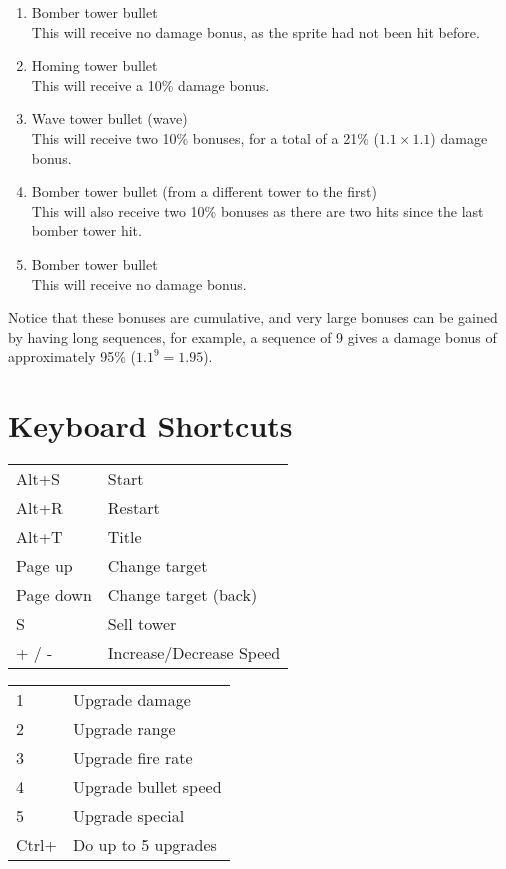 \documentclass[a4paper,11pt]{article}
\begin{document}
\begin{enumerate}
 \item Bomber tower bullet\\
 This will receive no damage bonus, as the sprite had not been hit before.
 \item Homing tower bullet\\
 This will receive a 10\% damage bonus.
 \item Wave tower bullet (wave)\\
 This will receive two 10\% bonuses, for a total of a 21\% (\(1.1 \times 1.1\)) damage bonus.
 \item Bomber tower bullet (from a different tower to the first)\\
 This will also receive two 10\% bonuses as there are two hits since the last bomber tower hit.
 \item Bomber tower bullet\\
 This will receive no damage bonus.
\end{enumerate}

Notice that these bonuses are cumulative, and very large bonuses can be gained by having long sequences, for example, a sequence of 9 gives a damage bonus of approximately 95\% (\(1.1^{9} = 1.95\)).

\section{Keyboard Shortcuts}

\begin{multicols}{2}
\begin{tabular}{l l}
Alt+S & Start\\
Alt+R & Restart\\
Alt+T & Title\\
Page up & Change target\\
Page down & Change target (back)\\
S & Sell tower\\
+ / - & Increase/Decrease Speed\\
\end{tabular}

\begin{tabular}{l l}
1 & Upgrade damage\\
2 & Upgrade range\\
3 & Upgrade fire rate\\
4 & Upgrade bullet speed\\
5 & Upgrade special\\
Ctrl+ & Do up to 5 upgrades\\
\end{tabular}
\end{multicols}
\end{document}
